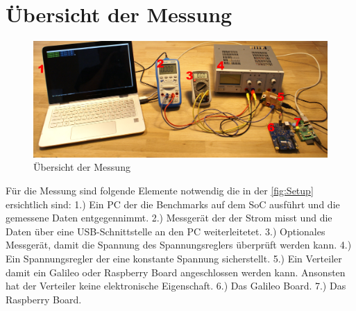 
\section{Übersicht der Messung}

\begin{figure}[H]
\centering
\includegraphics[width=1.0\textwidth]{images/setup.jpg}
\caption{Übersicht der Messung}
\label{fig:Setup}
\end{figure}

Für die Messung sind folgende Elemente notwendig die in der \autoref{fig:Setup} ersichtlich sind: 1.) Ein PC der die Benchmarks auf dem SoC ausführt und die gemessene Daten entgegennimmt. 2.) Messgerät der der Strom misst und die Daten über eine USB-Schnittstelle an den PC weiterleitetet. 3.) Optionales Messgerät, damit die Spannung des Spannungsreglers überprüft werden kann. 4.) Ein Spannungsregler der eine konstante Spannung sicherstellt. 5.) Ein Verteiler damit ein Galileo oder Raspberry Board angeschlossen werden kann. Ansonsten hat der Verteiler keine elektronische Eigenschaft. 6.) Das Galileo Board. 7.) Das Raspberry Board.

